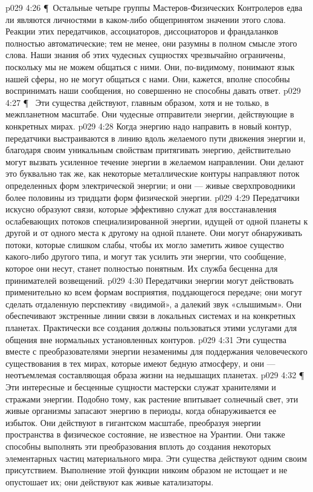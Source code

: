 \vs p029 4:26 \P\ Остальные четыре группы Мастеров\hyp{}Физических Контролеров едва ли являются личностями в каком\hyp{}либо общепринятом значении этого слова. Реакции этих передатчиков, ассоциаторов, диссоциаторов и франдаланков полностью автоматические; тем не менее, они разумны в полном смысле этого слова. Наши знания об этих чудесных сущностях чрезвычайно ограничены, поскольку мы не можем общаться с ними. Они, по\hyp{}видимому, понимают язык нашей сферы, но не могут общаться с нами. Они, кажется, вполне способны воспринимать наши сообщения, но совершенно не способны давать ответ.
\vs p029 4:27 \P\ \bibnobreakspace {} Эти существа действуют, главным образом, хотя и не только, в межпланетном масштабе. Они чудесные отправители энергии, действующие в конкретных мирах.
\vs p029 4:28 Когда энергию надо направить в новый контур, передатчики выстраиваются в линию вдоль желаемого пути движения энергии и, благодаря своим уникальным свойствам притягивать энергию, действительно могут вызвать усиленное течение энергии в желаемом направлении. Они делают это буквально так же, как некоторые металлические контуры направляют поток определенных форм электрической энергии; и они --- живые сверхпроводники более половины из тридцати форм физической энергии.
\vs p029 4:29 Передатчики искусно образуют связи, которые эффективно служат для восстанавления ослабевающих потоков специализированной энергии, идущей от одной планеты к другой и от одного места к другому на одной планете. Они могут обнаруживать потоки, которые слишком слабы, чтобы их могло заметить живое существо какого\hyp{}либо другого типа, и могут так усилить эти энергии, что сообщение, которое они несут, станет полностью понятным. Их служба бесценна для принимателей возвещений.
\vs p029 4:30 Передатчики энергии могут действовать применительно ко всем формам восприятия, поддающегося передаче; они могут сделать отдаленную перспективу «видимой», а далекий звук «слышимым». Они обеспечивают экстренные линии связи в локальных системах и на конкретных планетах. Практически все создания должны пользоваться этими услугами для общения вне нормальных установленных контуров.
\vs p029 4:31 Эти существа вместе с преобразователями энергии незаменимы для поддержания человеческого существования в тех мирах, которые имеют бедную атмосферу, и они --- неотъемлемая составляющая образа жизни на недышащих планетах.
\vs p029 4:32 \P\ \bibnobreakspace {} Эти интересные и бесценные сущности мастерски служат хранителями и стражами энергии. Подобно тому, как растение впитывает солнечный свет, эти живые организмы запасают энергию в периоды, когда обнаруживается ее избыток. Они действуют в гигантском масштабе, преобразуя энергии пространства в физическое состояние, не известное на Урантии. Они также способны выполнять эти преобразования вплоть до создания некоторых элементарных частиц материального мира. Эти существа действуют одним своим присутствием. Выполнение этой функции никоим образом не истощает и не опустошает их; они действуют как живые катализаторы.
